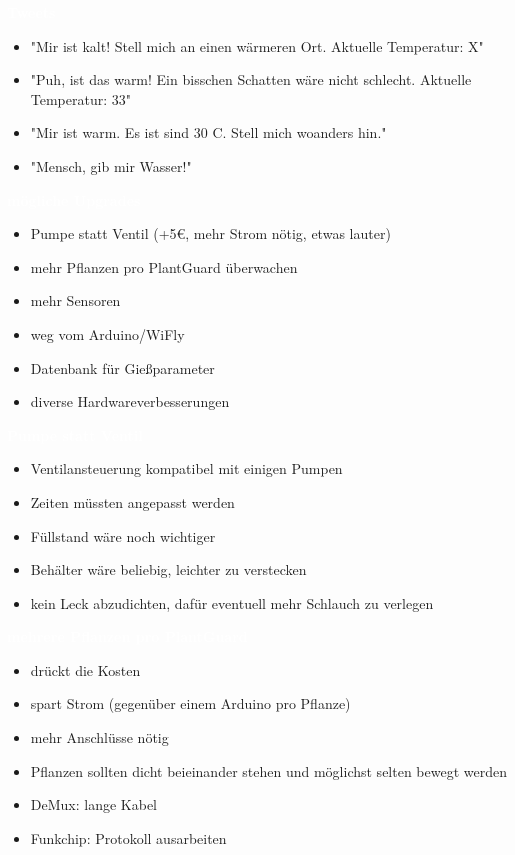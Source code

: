 \documentclass[bigger]{beamer}
\newcommand{\topic}[1]{{\huge{\textcolor{white}{\textbf{#1}}}}}
\begin{document}

\begin{frame}{\topic{Tweets}}
	\begin{itemize}
      \item "Mir ist kalt! Stell mich an einen wärmeren Ort. Aktuelle Temperatur: X"
      \item "Puh, ist das warm! Ein bisschen Schatten wäre nicht schlecht. Aktuelle Temperatur: 33"
      \item "Mir ist warm. Es ist sind 30 C. Stell mich woanders hin."
      \item "Mensch, gib mir Wasser!"
	\end{itemize}
\end{frame}

\begin{frame}{\topic{mögliche Upgrades}}
	\begin{itemize}
		\item Pumpe statt Ventil (+{5\euro}, mehr Strom nötig, etwas lauter)
		\item mehr Pflanzen pro PlantGuard überwachen
		\item mehr Sensoren
		\item weg vom Arduino/WiFly
		\item Datenbank für Gießparameter
		\item diverse Hardwareverbesserungen
	\end{itemize}
\end{frame}

\begin{frame}{\topic{Pumpe statt Ventil}}
	\begin{itemize}
		\item Ventilansteuerung kompatibel mit einigen Pumpen
		\item Zeiten müssten angepasst werden
		\item Füllstand wäre noch wichtiger
		\item Behälter wäre beliebig, leichter zu verstecken
		\item kein Leck abzudichten, dafür eventuell mehr Schlauch zu verlegen
	\end{itemize}
\end{frame}

\begin{frame}{\topic{mehrere Pflanzen pro PlantGuard}}
	\begin{itemize}
		\item drückt die Kosten
		\item spart Strom (gegenüber einem Arduino pro Pflanze)
		\item mehr Anschlüsse nötig
    	\item Pflanzen sollten dicht beieinander stehen und möglichst selten bewegt werden
		\item DeMux: lange Kabel
		\item Funkchip: Protokoll ausarbeiten
	\end{itemize}
\end{frame}
\end{document}
